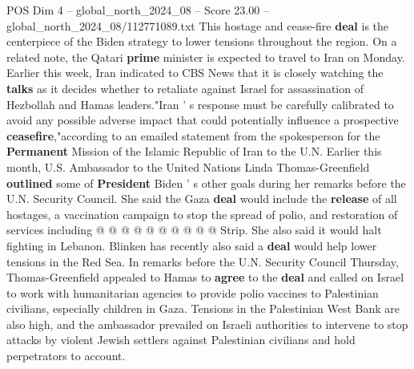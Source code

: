 \begin{textsample}{POS Dim 4 – global\_north\_2024\_08 – Score 23.00 – global\_north\_2024\_08/112771089.txt}
This hostage and cease-fire \textbf{deal} is the centerpiece of the Biden strategy to lower tensions throughout the region.
On a related note, the Qatari \textbf{prime} minister is expected to travel to Iran on Monday.
Earlier this week, Iran indicated to CBS News that it is closely watching the \textbf{talks} as it decides whether to retaliate against Israel for assassination of Hezbollah and Hamas leaders."Iran ' s response must be carefully calibrated to avoid any possible adverse impact that could potentially influence a prospective \textbf{ceasefire},"according to an emailed statement from the spokesperson for the \textbf{Permanent} Mission of the Islamic Republic of Iran to the U.N.
Earlier this month, U.S.
Ambassador to the United Nations Linda Thomas-Greenfield \textbf{outlined} some of \textbf{President} Biden ' s other goals during her remarks before the U.N.
Security Council.
She said the Gaza \textbf{deal} would include the \textbf{release} of all hostages, a vaccination campaign to stop the spread of polio, and restoration of services including @ @ @ @ @ @ @ @ @ @ Strip.
She also said it would halt fighting in Lebanon.
Blinken has recently also said a \textbf{deal} would help lower tensions in the Red Sea.
In remarks before the U.N.
Security Council Thursday, Thomas-Greenfield appealed to Hamas to \textbf{agree} to the \textbf{deal} and called on Israel to work with humanitarian agencies to provide polio vaccines to Palestinian civilians, especially children in Gaza.
Tensions in the Palestinian West Bank are also high, and the ambassador prevailed on Israeli authorities to intervene to stop attacks by violent Jewish settlers against Palestinian civilians and hold perpetrators to account.

\end{textsample}
